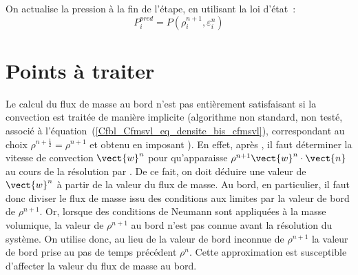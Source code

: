 On actualise la pression \`a la fin de l'\'etape, en utilisant la loi d'\'etat~:
\begin{equation}
\displaystyle P_i^{pred}=P(\rho_i^{n+1},\varepsilon_i^{n})
\end{equation}


\section*{Points \`a traiter}
Le calcul du flux de masse au  bord n'est pas enti\`erement satisfaisant
si la convection est trait\'ee de mani\`ere implicite
(algorithme non standard, non test\'e,
associ\'e \`a l'\'equation~(\ref{Cfbl_Cfmsvl_eq_densite_bis_cfmsvl}),
correspondant au choix $\rho^{n+\frac{1}{2}}=\rho^{n+1}$ et
obtenu en imposant ).
En effet, apr\`es , il faut d\'eterminer la vitesse de
convection $\vect{w}^n$ pour qu'apparaisse
$\rho^{n+1} \vect{w}^n\cdot\vect{n}$
au cours de la r\'esolution par . De ce fait, on doit d\'eduire
une valeur de $\vect{w}^n$ \`a partir de la valeur
du flux de masse. Au bord, en particulier, il faut
donc diviser le flux de masse
issu des conditions aux limites par la valeur de bord de $\rho^{n+1}$.
Or, lorsque des conditions de Neumann sont appliqu\'ees \`a la
masse volumique,
la valeur de $\rho^{n+1}$ au bord n'est pas connue avant la r\'esolution du
syst\`eme. On utilise donc, au lieu de la valeur de bord inconnue de
$\rho^{n+1}$ la valeur de bord prise au pas de temps
pr\'ec\'edent $\rho^{n}$. Cette approximation est susceptible
d'affecter la valeur du flux de masse au bord.
